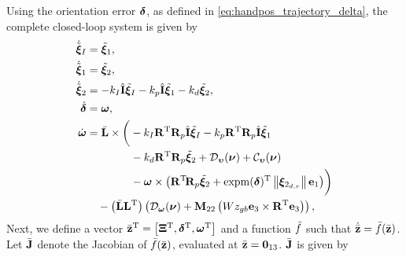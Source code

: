 Using the orientation error $\bm{\delta}$, as defined in \eqref{eq:handpos_trajectory_delta}, the complete closed-loop system is given by
\begin{subequations}
    \begin{align}
        \dot{\tilde{\bm{\xi}}}_I &= \tilde{\bm{\xi}}_1, \\
        \dot{\tilde{\bm{\xi}}}_1 &= \tilde{\bm{\xi}}_2, \\
        \dot{\tilde{\bm{\xi}}}_2 &= -k_I \hat{\mathbf{I}} \tilde{\bm{\xi}}_I - k_p \hat{\mathbf{I}} \tilde{\bm{\xi}}_1 - k_d \tilde{\bm{\xi}}_2, \\
        \dot{\bm{\delta}} &= \bm{\omega}, \\
        \dot{\bm{\omega}} &= \Bar{\mathbf{L}} \times \bigg(-k_I \mathbf{R}^{\mathrm{T}} \mathbf{R}_p \hat{\mathbf{I}} \tilde{\bm{\xi}}_I - k_p \mathbf{R}^{\mathrm{T}} \mathbf{R}_p \hat{\mathbf{I}} \tilde{\bm{\xi}}_1 \nonumber \\
        &\qquad \qquad - k_d \mathbf{R}^{\mathrm{T}} \mathbf{R}_p \tilde{\bm{\xi}}_2 + \mathcal{D}_{\bm{\upsilon}}(\bm{\nu}) + \mathcal{C}_{\bm{\upsilon}}(\bm{\nu}) \nonumber \\
        &\qquad \qquad - \bm{\omega} \times \left(\mathbf{R}^{\mathrm{T}}\! \mathbf{R}_p \tilde{\bm{\xi}}_2 + {\rm expm}(\bm{\delta})^{\mathrm{T}} \left\|\bm{\xi}_{2_{d,r}}\right\|\mathbf{e}_1\right)\!\bigg) \nonumber \\
        &\quad - \left(\Bar{\mathbf{L}}\mathbf{L}^{\mathrm{T}}\right) \left(\mathcal{D}_{\bm{\omega}}(\bm{\nu}) + \mathbf{M}_{22}\left(Wz_{gb} \mathbf{e}_3 \times \mathbf{R}^{\mathrm{T}} \mathbf{e}_3\right)\right),
    \end{align}
\end{subequations}
Next, we define a vector $\Bar{\mathbf{z}}^{\mathrm{T}} = \left[\bm{\Xi}^{\mathrm{T}}, \bm{\delta}^{\mathrm{T}}, \bm{\omega}^{\mathrm{T}}\right]$ and a function $\Bar{f}$ such that $\dot{\Bar{\mathbf{z}}} = \Bar{f}(\Bar{\mathbf{z}})$.
Let $\Bar{\mathbf{J}}$ denote the Jacobian of $\Bar{f}(\Bar{\mathbf{z}})$, evaluated at $\Bar{\mathbf{z}} = \mathbf{0}_{13}$.
$\Bar{\mathbf{J}}$ is given by

